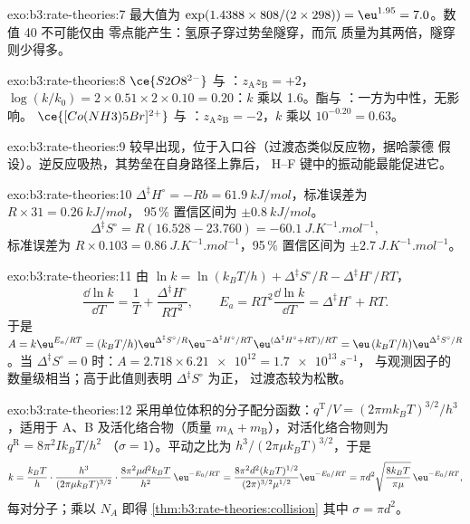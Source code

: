 \begin{solution}{exo:b3:rate-theories:7}
最大值为 $\exp(1.4388 \times 808/(2 \times 298)) = \eu^{1.95} = 7.0$。数值 40 不可能仅由
零点能产生：氢原子穿过势垒隧穿，而氘
质量为其两倍，隧穿则少得多。
\end{solution}

\begin{solution}{exo:b3:rate-theories:8}
$\ce{S2O8^{2-}}$ 与 ：$z_{\mathrm A}z_{\mathrm B} = +2$，$\log(k/k_0) = 2 \times 0.51 \times 2 \times 0.10 = 0.20$：$k$
乘以 1.6。酯与 ：一方为中性，无影响。
$\ce{[Co(NH3)5Br]^{2+}}$ 与 ：$z_{\mathrm A}z_{\mathrm B} = -2$，$k$ 乘以 $10^{-0.20} = 0.63$。
\end{solution}

\begin{solution}{exo:b3:rate-theories:9}
较早出现，位于入口谷（过渡态类似反应物，据哈蒙德
假设）。逆反应吸热，其势垒在自身路径上靠后，
H--F 键中的振动能最能促进它。
\end{solution}

\begin{solution}{exo:b3:rate-theories:10}
$\Delta^{\ddagger}H^\circ = -Rb = \qty{61.9}{kJ/mol}$，标准误差为 $R \times 31 = \qty{0.26}{kJ/mol}$，
95\,\% 置信区间为 $\pm\qty{0.8}{kJ/mol}$。
\[
  \Delta^{\ddagger}S^\circ = R(16.528 - 23.760) = \qty{-60.1}{J.K^{-1}.mol^{-1}},
\]
标准误差为 $R \times 0.103 = \qty{0.86}{J.K^{-1}.mol^{-1}}$，95\,\% 置信区间为 $\pm\qty{2.7}{J.K^{-1}.mol^{-1}}$。
\end{solution}

\begin{solution}{exo:b3:rate-theories:11}
由 $\ln k = \ln(k_BT/h) + \Delta^{\ddagger}S^\circ/R - \Delta^{\ddagger}H^\circ/RT$，
\[
  \frac{\dd\ln k}{\dd T} = \frac1T + \frac{\Delta^{\ddagger}H^\circ}{RT^2}, \qquad
  E_a = RT^2\frac{\dd\ln k}{\dd T} = \Delta^{\ddagger}H^\circ + RT .
\] 于是 $A = k\eu^{E_a/RT} = (k_BT/h)\eu^{\Delta^{\ddagger}S^\circ/R}\eu^{-\Delta^{\ddagger}H^\circ/RT}\eu^{(\Delta^{\ddagger}H^\circ + RT)/RT} =
\eu\,(k_BT/h)\eu^{\Delta^{\ddagger}S^\circ/R}$。当 $\Delta^{\ddagger}S^\circ = 0$ 时：$A = 2.718 \times \num{6.21e12} = \qty{1.7e13}{s^{-1}}$，
与观测因子的数量级相当；高于此值则表明 $\Delta^{\ddagger}S^\circ$ 为正，
过渡态较为松散。
\end{solution}

\begin{solution}{exo:b3:rate-theories:12}
采用单位体积的分子配分函数：$q^{\mathrm T}/V = (2\pi mk_BT)^{3/2}/h^3$，适用于
A、B 及活化络合物（质量 $m_{\mathrm A} + m_{\mathrm B}$），对活化络合物则为 $q^{\mathrm R} = 8\pi^2Ik_BT/h^2$
（$\sigma = 1$）。平动之比为 $h^3/(2\pi\mu k_BT)^{3/2}$，于是
\[
  k = \frac{k_BT}{h}\cdot\frac{h^3}{(2\pi\mu k_BT)^{3/2}}\cdot\frac{8\pi^2\mu d^2k_BT}{h^2}\,\eu^{-E_0/RT}
    = \frac{8\pi^2d^2(k_BT)^{1/2}}{(2\pi)^{3/2}\mu^{1/2}}\eu^{-E_0/RT}
    = \pi d^2\sqrt{\frac{8k_BT}{\pi\mu}}\,\eu^{-E_0/RT},
\]
每对分子；乘以 $N_A$ 即得 \cref{thm:b3:rate-theories:collision}
其中 $\sigma = \pi d^2$。
\end{solution}

